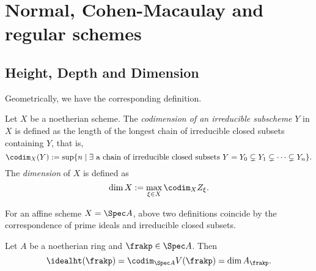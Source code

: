 \section{Normal, Cohen-Macaulay and regular schemes}

\subsection{Height, Depth and Dimension }


    Geometrically, we have the corresponding definition.
    \begin{definition}\label{def: dimension of schemes}
        Let $X$ be a noetherian scheme.
        The \textit{codimension of an irreducible subscheme} $Y$ in $X$ is defined as the length of the longest chain of irreducible closed subsets containing $Y$, that is, 
        \[ \codim_X(Y) := \sup\{ n \mid \exists \text{ a chain of irreducible closed subsets } Y = Y_0 \subsetneq Y_1 \subsetneq \cdots \subsetneq Y_n\}. \] 
        The \textit{dimension} of $X$ is defined as
        \[ \dim X := \max_{\xi \in X}\codim_X Z_\xi. \]
    \end{definition}

    For an affine scheme $X = \Spec A$, above two definitions coincide by the correspondence of prime ideals and irreducible closed subsets.

    \begin{proposition}\label{prop: dimension of localization, height and codimension}
        Let $A$ be a noetherian ring and $\frakp \in \Spec A$.
        Then 
        \[ \idealht(\frakp) = \codim_{\Spec A} V(\frakp) = \dim A_{\frakp}. \]
    \end{proposition}

